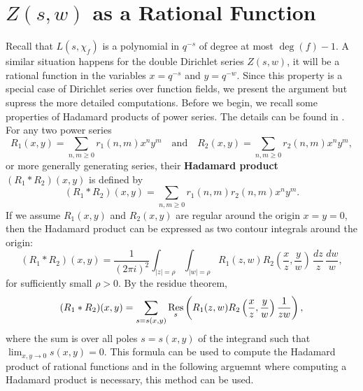 \documentclass[12pt,reqno,oneside]{amsart}
\begin{document}
\section*{\texorpdfstring{$Z(s,w)$}{Z(s,w)} as a Rational Function}
    Recall that $L(s,\chi_{f})$ is a polynomial in $q^{-s}$ of degree at most $\deg(f)-1$. A similar situation happens for the double Dirichlet series $Z(s,w)$, it will be a rational function in the variables $x = q^{-s}$ and $y = q^{-w}$. Since this property is a special case of Dirichlet series over function fields, we present the argument but supress the more detailed computations. Before we begin, we recall some properties of Hadamard products of power series. The details can be found in \cite{S}. For any two power series
    \[
        R_{1}(x,y) = \sum_{n,m \ge 0}r_{1}(n,m)x^{n}y^{m} \quad \text{and} \quad R_{2}(x,y) = \sum_{n,m \ge 0}r_{2}(n,m)x^{n}y^{m},
    \]
    or more generally generating series, their \textbf{Hadamard product} $(R_{1} \ast R_{2})(x,y)$ is defined by
    \[
        (R_{1} \ast R_{2})(x,y) = \sum_{n,m \ge 0}r_{1}(n,m)r_{2}(n,m)x^{n}y^{m}.
    \]
    If we assume $R_{1}(x,y)$ and $R_{2}(x,y)$ are regular around the origin $x = y = 0$, then the Hadamard product can be expressed as two contour integrals around the origin:
    \[
        (R_{1} \ast R_{2})(x,y) = \frac{1}{(2\pi i)^{2}}\int_{|z| = \rho}\int_{|w| = \rho}R_{1}(z,w)R_{2}\left(\frac{x}{z},\frac{y}{w}\right)\,\frac{dz}{z}\,\frac{dw}{w},
    \]
    for sufficiently small $\rho > 0$. By the residue theorem,
    \[
        (R_{1} \ast R_{2})(x,y) = \sum_{s = s(x,y)}\operatorname*{\mathrm{Res}}_{s}\left(R_{1}(z,w)R_{2}\left(\frac{x}{z},\frac{y}{w}\right)\frac{1}{zw}\right),
    \]
    where the sum is over all poles $s = s(x,y)$ of the integrand such that $\lim_{x,y \to 0}s(x,y) = 0$. This formula can be used to compute the Hadamard product of rational functions and in the following arguemnt where computing a Hadamard product is necessary, this method can be used.
\end{document}

